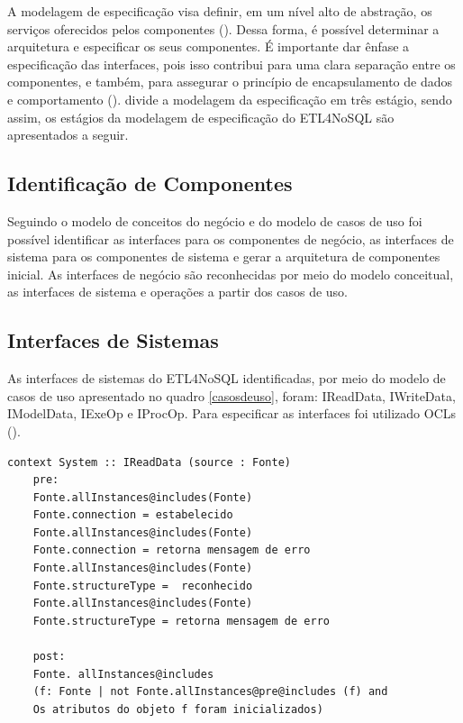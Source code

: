 A modelagem de especificação visa definir, em um nível alto de abstração, os serviços oferecidos pelos componentes (\cite{itana:2005}). Dessa forma, é possível determinar a arquitetura e especificar os seus componentes. É importante dar ênfase a especificação das interfaces, pois isso contribui para uma clara separação entre os componentes, e também, para assegurar o princípio de encapsulamento de dados e comportamento (\cite{itana:2005}). \cite{cheesman:2001} divide a modelagem da especificação em três estágio, sendo assim, os estágios da modelagem de especificação do ETL4NoSQL são apresentados a seguir.


\subsection{Identificação de Componentes}
Seguindo o modelo de conceitos do negócio e do modelo de casos de uso foi possível identificar as interfaces para os componentes de negócio, as interfaces de sistema para os componentes de sistema e gerar a arquitetura de componentes inicial. As interfaces de negócio são reconhecidas por meio do modelo conceitual,  as interfaces de sistema e operações a partir dos casos de uso.

\subsection{Interfaces de Sistemas}

As interfaces de sistemas do ETL4NoSQL identificadas, por meio do modelo de casos de uso apresentado no quadro \ref{casosdeuso}, foram: IReadData, IWriteData, IModelData, IExeOp e IProcOp. Para especificar as interfaces foi utilizado \acp{OCL} (\cite{warmer:1998}).
\\
%
\begin{lstlisting}[frame=single, language=Oberon-2, basicstyle=\tiny]
	context System :: IReadData (source : Fonte)	
	pre:	
	Fonte.allInstances@includes(Fonte) 
	Fonte.connection = estabelecido	
	Fonte.allInstances@includes(Fonte) 
	Fonte.connection = retorna mensagem de erro
	Fonte.allInstances@includes(Fonte) 
	Fonte.structureType =  reconhecido	
	Fonte.allInstances@includes(Fonte)
	Fonte.structureType = retorna mensagem de erro	
	
	post:
	Fonte. allInstances@includes 
	(f: Fonte | not Fonte.allInstances@pre@includes (f) and	
	Os atributos do objeto f foram inicializados)	
\end{lstlisting}

